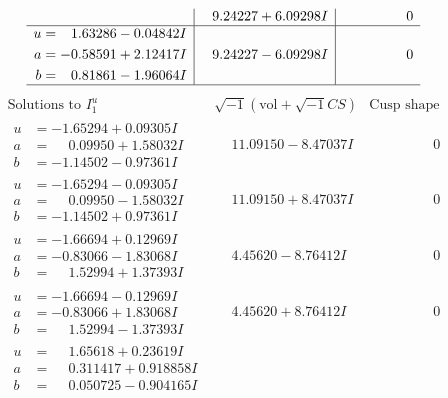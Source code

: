 \documentclass[1p]{elsarticle_modified}
\theoremstyle{definition}
\newcommand{\I}{\sqrt{-1}}
\begin{document}
$$\begin{array}{c|c|c}
 & \phantom{-}9.24227 + 6.09298 I & \phantom{-0.000000 } 0 \\ \hline\begin{aligned}
u &= \phantom{-}1.63286 - 0.04842 I \\
a &= -0.58591 + 2.12417 I \\
b &= \phantom{-}0.81861 - 1.96064 I\end{aligned}
 & \phantom{-}9.24227 - 6.09298 I & \phantom{-0.000000 } 0\\
 \hline 
 \end{array}$$\newpage$$\begin{array}{c|c|c}  
\text{Solutions to }I^u_{1}& \I (\text{vol} + \sqrt{-1}CS) & \text{Cusp shape}\\
 \hline 
\begin{aligned}
u &= -1.65294 + 0.09305 I \\
a &= \phantom{-}0.09950 + 1.58032 I \\
b &= -1.14502 - 0.97361 I\end{aligned}
 & \phantom{-}11.09150 - 8.47037 I & \phantom{-0.000000 } 0 \\ \hline\begin{aligned}
u &= -1.65294 - 0.09305 I \\
a &= \phantom{-}0.09950 - 1.58032 I \\
b &= -1.14502 + 0.97361 I\end{aligned}
 & \phantom{-}11.09150 + 8.47037 I & \phantom{-0.000000 } 0 \\ \hline\begin{aligned}
u &= -1.66694 + 0.12969 I \\
a &= -0.83066 - 1.83068 I \\
b &= \phantom{-}1.52994 + 1.37393 I\end{aligned}
 & \phantom{-}4.45620 - 8.76412 I & \phantom{-0.000000 } 0 \\ \hline\begin{aligned}
u &= -1.66694 - 0.12969 I \\
a &= -0.83066 + 1.83068 I \\
b &= \phantom{-}1.52994 - 1.37393 I\end{aligned}
 & \phantom{-}4.45620 + 8.76412 I & \phantom{-0.000000 } 0 \\ \hline\begin{aligned}
u &= \phantom{-}1.65618 + 0.23619 I \\
a &= \phantom{-}0.311417 + 0.918858 I \\
b &= \phantom{-}0.050725 - 0.904165 I\end{aligned}

\end{array}$$
\end{document}
